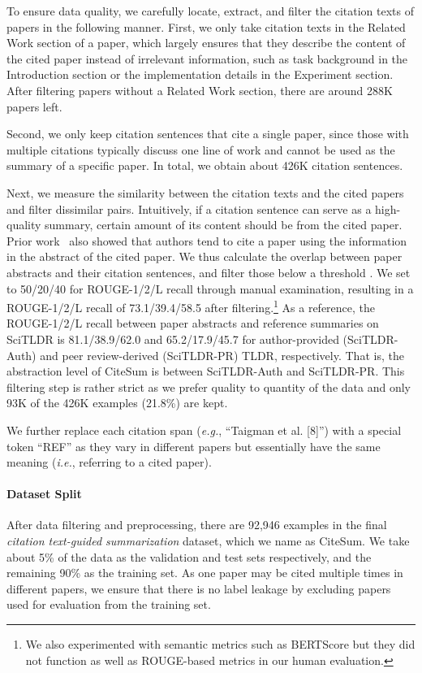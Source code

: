 \documentclass[11pt]{article}
\newcommand{\ie}{\textit{i.e.}} \newcommand{\eg}{\textit{e.g.}} \newcommand{\start}[1]{\vspace{.0mm}\noindent{{\bf #1}.}}
\newcommand{\ourdata}{CiteSum\xspace}
\begin{document}
To ensure data quality, we carefully locate, extract, and filter the citation texts of papers in the following manner.
First, we only take citation texts in the Related Work section of a paper, which largely ensures that they describe the content of the cited paper instead of irrelevant information, such as task background in the Introduction section or the implementation details in the Experiment section.
After filtering papers without a Related Work section, there are around 288K papers left.

Second, we only keep citation sentences that cite a single paper, since those with multiple citations typically discuss one line of work and cannot be used as the summary of a specific paper.
In total, we obtain about 426K citation sentences.



Next, we measure the similarity between the citation texts and the cited papers and filter dissimilar pairs.
Intuitively, if a citation sentence can serve as a high-quality summary, certain amount of its content should be from the cited paper.
Prior work~\cite{lu-etal-2020-multi-xscience} also showed that authors tend to cite a paper using the information in the abstract of the cited paper.
We thus calculate the overlap between paper abstracts and their citation sentences, and filter those below a threshold .
We set  to 50/20/40 for ROUGE-1/2/L recall through manual examination, resulting in a ROUGE-1/2/L recall of 73.1/39.4/58.5 after filtering.\footnote{We also experimented with semantic metrics such as BERTScore \cite{zhang2019bertscore} but they did not function as well as ROUGE-based metrics in our human evaluation.}
As a reference, the ROUGE-1/2/L recall between paper abstracts and reference summaries on SciTLDR \cite{cachola-etal-2020-tldr} is 81.1/38.9/62.0 and 65.2/17.9/45.7 for author-provided (SciTLDR-Auth) and peer review-derived (SciTLDR-PR) TLDR, respectively.
That is, the abstraction level of \ourdata is between SciTLDR-Auth and SciTLDR-PR.
This filtering step is rather strict as we prefer quality to quantity of the data and only 93K of the 426K examples (21.8\%) are kept.

We further replace each citation span (\eg, ``Taigman et al. [8]'') with a special token ``REF'' as they vary in different papers but essentially have the same meaning (\ie, referring to a cited paper).

\paragraph{Dataset Split}
After data filtering and preprocessing,  there are 92,946 examples in the final \textit{citation text-guided summarization} dataset, which we name as \ourdata.
We take about 5\% of the data as the validation and test sets respectively, and the remaining 90\% as the training set.
As one paper may be cited multiple times in different papers, we ensure that there is no label leakage by excluding papers used for evaluation from the training set.
\end{document}
